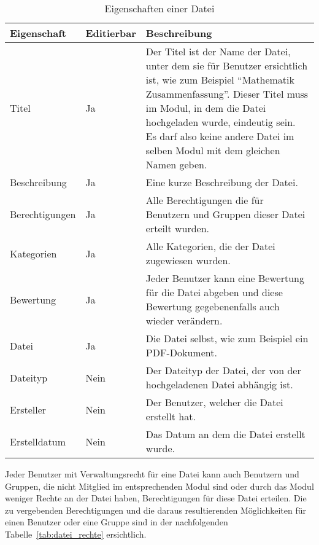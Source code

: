 \begin{table}[H]
\begin{tabularx}{\textwidth}{|l|l|X|} \hline
\textbf{Eigenschaft} &\textbf{Editierbar} & \textbf{Beschreibung} \\ \hline
Titel				& Ja 	& Der Titel ist der Name der Datei, unter dem sie für Benutzer ersichtlich ist, wie zum Beispiel “Mathematik Zusammenfassung”. Dieser Titel muss im Modul, in dem die Datei hochgeladen wurde, eindeutig sein. Es darf also keine andere Datei im selben Modul mit dem gleichen Namen geben.\\ \hline
Beschreibung		& Ja 	& Eine kurze Beschreibung der Datei.\\ \hline
Berechtigungen		& Ja 	& Alle Berechtigungen die für Benutzern und Gruppen dieser Datei erteilt wurden.\\ \hline
Kategorien			& Ja 	& Alle Kategorien, die der Datei zugewiesen wurden.\\ \hline
Bewertung			& Ja	& Jeder Benutzer kann eine Bewertung für die Datei abgeben und diese Bewertung gegebenenfalls auch wieder verändern.\\ \hline
Datei 				& Ja	& Die Datei selbst, wie zum Beispiel ein PDF-Dokument.\\ \hline
Dateityp			& Nein	& Der Dateityp der Datei, der von der hochgeladenen Datei abhängig ist.\\ \hline
Ersteller	 		& Nein 	& Der Benutzer, welcher die Datei erstellt hat.\\ \hline
Erstelldatum		& Nein 	& Das Datum an dem die Datei erstellt wurde.\\ \hline
\end{tabularx}
\caption{Eigenschaften einer Datei}
\label{tab:datei_eigenschaften}
\end{table}

Jeder Benutzer mit Verwaltungsrecht für eine Datei kann auch Benutzern und Gruppen, die nicht Mitglied im entsprechenden Modul sind oder durch das Modul weniger Rechte an der Datei haben, Berechtigungen für diese Datei erteilen. Die zu vergebenden Berechtigungen und die daraus resultierenden Möglichkeiten für einen Benutzer oder eine Gruppe sind in der nachfolgenden Tabelle~\ref{tab:datei_rechte} ersichtlich.

